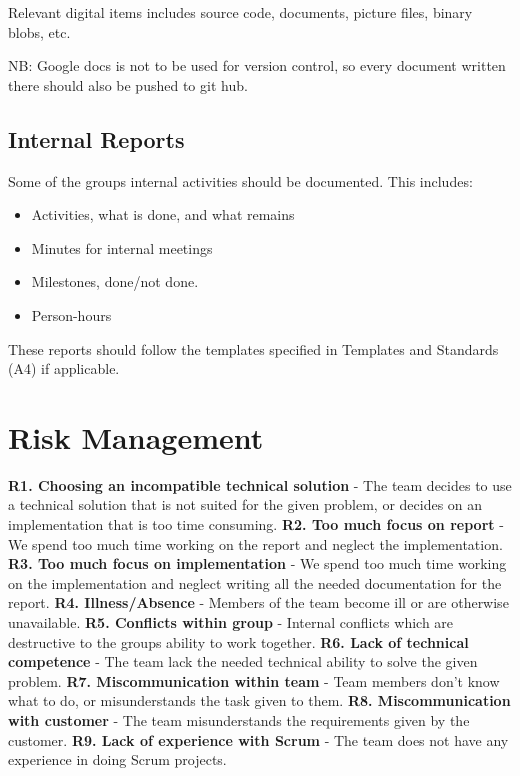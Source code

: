 Relevant digital items includes source code, documents, picture files, binary blobs, etc.

NB: Google docs is not to be used for version control, so every document written there should also be pushed to git hub.

\subsection{Internal Reports}
Some of the groups internal activities should be documented. This includes:
\begin{itemize}
	\item Activities, what is done, and what remains
	\item Minutes for internal meetings
	\item Milestones, done/not done.
	\item Person-hours
\end{itemize}
These reports should follow the templates specified in Templates and Standards (A4) if applicable.

\section{Risk Management}

\textbf{R1. Choosing an incompatible technical solution} - The team decides to use a technical solution that is not suited for the given problem, or decides on an implementation that is too time consuming. \newline
\textbf{R2. Too much focus on report} -  We spend too much time working on the report and neglect the implementation. \newline
\textbf{R3. Too much focus on implementation} - We spend too much time working on the implementation and neglect writing all the needed documentation for the report. \newline
\textbf{R4. Illness/Absence} - Members of the team become ill or are otherwise unavailable. \newline
\textbf{R5. Conflicts within group} - Internal conflicts which are destructive to the groups ability to work together. \newline
\textbf{R6. Lack of technical competence} - The team lack the needed technical ability to solve the given problem. \newline
\textbf{R7. Miscommunication within team} - Team members don’t know what to do, or misunderstands the task given to them. \newline
\textbf{R8. Miscommunication with customer} - The team misunderstands the requirements given by the customer. \newline
\textbf{R9. Lack of experience with Scrum} - The team does not have any experience in doing Scrum projects. \newline

